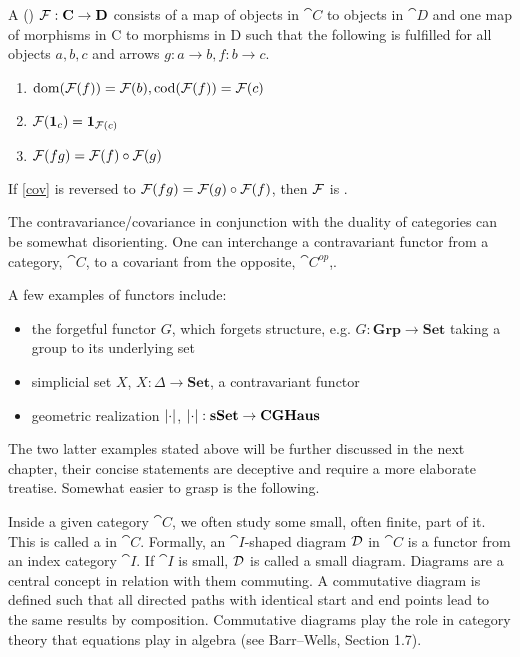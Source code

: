 \documentclass[../../main.tex]{subfiles}
\begin{document}
    \begin{definition}
        A ()  $\functor{F}: \cat{C} \to \cat{D}$ consists of a map of objects in $\cat{C}$ to objects in $\cat{D}$ and one map of morphisms in C to morphisms in D such that the following is fulfilled for all objects $a, b, c$ and arrows $g: a \to b, f: b \to c$.
        
        \begin{enumerate}
            \item $\domain{\functor{F}(f)} = \functor{F}(b), \codomain{\functor{F}(f)} = \functor{F}(c)$
            \item $\functor{F}(\idarrow[c]) = \idarrow[\functor{F}(c)]$
            \item $\functor{F}(fg) = \functor{F}(f) \circ \functor{F}(g)$ \label{cov}
        \end{enumerate}
        
        If \ref{cov} is reversed to $\functor{F}(fg) = \functor{F}(g) \circ \functor{F}(f)$, then $\functor{F}$ is .
    \end{definition}
    
    The contravariance/covariance in conjunction with the duality of categories can be somewhat disorienting. One can interchange a contravariant functor from a category, $\cat{C}$, to a covariant from the opposite, $\cat{C^{op}}$,.

    \begin{example}
        A few examples of functors include:
        \begin{itemize}
            \item the forgetful functor $G$, which forgets structure, e.g. $G:\mathbf{Grp}\to \mathbf{Set}$ taking a group to its underlying set
            \item simplicial set $X$, $X:\Delta\to \mathbf{Set}$, a contravariant functor
            \item geometric realization $\geom[\cdot]$, $\geom[\cdot]:\mathbf{sSet}\to \mathbf{CGHaus}$
        \end{itemize}
        \label{functor_exmp}
    \end{example}

    The two latter examples stated above will be further discussed in the next chapter, their concise statements are deceptive and require a more elaborate treatise. Somewhat easier to grasp is the following.
    
    Inside a given category $\cat{C}$, we often study some small, often finite, part of it. This is called a  in $\cat{C}$. Formally, an $\cat{I}$-shaped diagram $\functor{D}$ in $\cat{C}$ is a functor from an index category $\cat{I}$. If $\cat{I}$ is small, $\functor{D}$ is called a small diagram. Diagrams are a central concept in relation with them commuting. A commutative diagram is defined such that all directed paths with identical start and end points lead to the same results by composition. Commutative diagrams play the role in category theory that equations play in algebra (see Barr–Wells, Section 1.7).%
    
\end{document}
